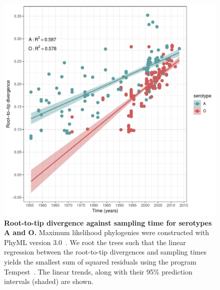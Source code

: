\documentclass[a4paper,10pt]{article}
\begin{document}
\begin{center}
\begin{figure}[H]
\begin{center}
\includegraphics[scale=.75]{FIGURES/PLOTS/rdvs.pdf}
\end{center}
\caption{
\textbf{Root-to-tip divergence against sampling time for serotypes A and O.}
Maximum likelihood phylogenies were constructed with PhyML version 3.0~\cite{M-Guindon2003}. 
We root the trees such that the linear regression between the root-to-tip divergences and sampling times yields the smallest sum of squared residuals using the program Tempest~\citep{M-Rambaut2016}.
The linear trends, along with their 95\% prediction intervals (shaded) are shown.
}
\label{sfig:root-to-tip}
\end{figure}
\end{center}
\newpage
\end{document}
